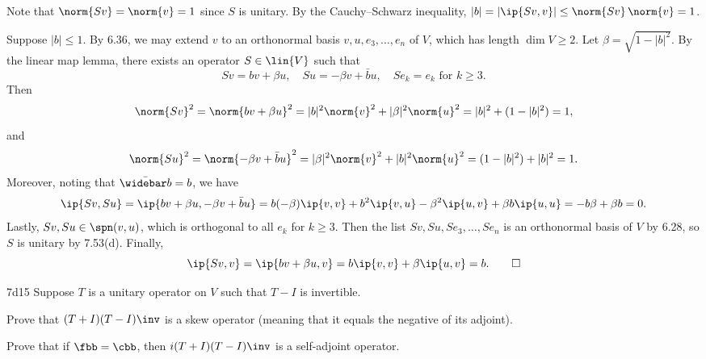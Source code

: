 \begin{soliff}
    \rightimp Note that $\norm{S v} = \norm{v} = 1$ since $S$ is unitary.
    By the Cauchy--Schwarz inequality, $|b| = |\ip{Sv, v}| \leq \norm{Sv}\,\norm{v} = 1$.

    \leftimp Suppose $|b| \leq 1$.
    By 6.36, we may extend $v$ to an orthonormal basis $v, u, e_3, \ldots, e_n$ of $V$, which has length $\dim V \geq 2$.
    Let $\beta = \sqrt{1 - |b|^2}$.
    By the linear map lemma, there exists an operator $S \in \lin{V}$ such that
    \[
        S v = b v + \beta u, \quad S u = -\beta v + \bar b u, \quad S e_k = e_k \text{ for } k \geq 3.
    \]
    Then
    \[
        \norm{S v}^2 = \norm{b v + \beta u}^2 = |b|^2 \norm{v}^2 + |\beta|^2 \norm{u}^2 = |b|^2 + (1 - |b|^2) = 1,
    \]
    and
    \[
        \norm{S u}^2 = \norm{-\beta v + \bar b u}^2 = |\beta|^2 \norm{v}^2 + |b|^2 \norm{u}^2 = (1 - |b|^2) + |b|^2 = 1.
    \]
    Moreover, noting that $\bar{\widebar b} = b$, we have
    \[
        \ip{S v, S u} = \ip{b v + \beta u, -\beta v + \bar b u} = b(-\beta) \ip{v, v} + b^2 \ip{v, u} - \beta^2 \ip{u, v} + \beta b \ip{u, u} = -b\beta + \beta b = 0.
    \]
    Lastly, $S v, S u \in \spn(v, u)$, which is orthogonal to all $e_k$ for $k \geq 3$.
    Then the list $S v, S u, S e_3, \ldots, S e_n$ is an orthonormal basis of $V$ by 6.28, so $S$ is unitary by 7.53(d).
    Finally,
    \[
        \ip{S v, v} = \ip{b v + \beta u, v} = b \ip{v, v} + \beta \ip{u, v} = b. \qedhere
    \]
\end{soliff}

\begin{exercise}{7d15}
    Suppose $T$ is a unitary operator on $V$ such that $T - I$ is invertible.
    \begin{subexercises}
        \item Prove that $(T + I)(T - I)\inv$ is a skew operator (meaning that it equals the negative of its adjoint).
        \item Prove that if $\fbb = \cbb$, then $i(T + I)(T - I)\inv$ is a self-adjoint operator.
    \end{subexercises}

\end{exercise}

